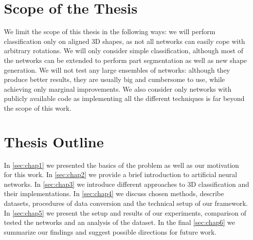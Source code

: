 \section{Scope of the Thesis}
We limit the scope of this thesis in the following ways: we will perform classification only on aligned 3D shapes, as not all networks can easily cope with arbitrary rotations. We will only consider simple classification, although most of the networks can be extended to perform part segmentation as well as new shape generation. We will not test any large ensembles of networks: although they produce better results, they are usually big and cumbersome to use, while achieving only marginal improvements. We also consider only networks with publicly available code as implementing all the different techniques is far beyond the scope of this work.

\section{Thesis Outline}
In \autoref{sec:chap1} we presented the basics of the problem as well as our motivation for this work. In \autoref{sec:chap2} we provide a brief introduction to artificial neural networks. In  \autoref{sec:chap3} we introduce different approaches to 3D classification and their implementations. In \autoref{sec:chap4} we discuss chosen methods, describe datasets, procedures of data conversion and the technical setup of our framework. In  \autoref{sec:chap5} we present the setup and results of our experiments, comparison of tested the networks and an analysis of the dataset. In the final  \autoref{sec:chap6} we summarize our findings and suggest possible directions for future work.
